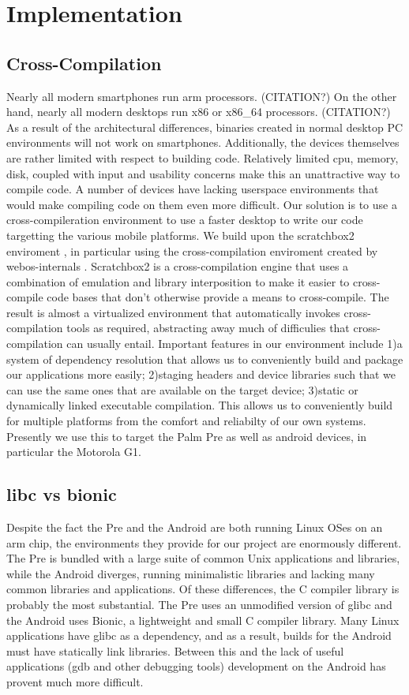 \section{Implementation}
\subsection{Cross-Compilation}
Nearly all modern smartphones run arm processors. (CITATION?)
On the other hand, nearly all modern desktops run x86 or x86\_64 processors. (CITATION?)
As a result of the architectural differences, binaries created in normal desktop PC environments will not work on smartphones.
Additionally, the devices themselves are rather limited with respect to building code.  Relatively limited cpu, memory, disk, coupled with input and usability concerns make this an unattractive way to compile code.  A number of devices have lacking userspace environments that would make compiling code on them even more difficult.
Our solution is to use a cross-compileration environment to use a faster desktop to write our code targetting the various mobile platforms.
We build upon the scratchbox2 enviroment \cite{sb2}, in particular using the cross-compilation enviroment created by webos-internals \cite{webosinterals}.
Scratchbox2 is a cross-compilation engine that uses a combination of emulation and library interposition to make it easier to cross-compile code bases that don't otherwise provide a means to cross-compile.
The result is almost a virtualized environment that automatically invokes cross-compilation tools as required, abstracting away much of difficulies that cross-compilation can usually entail.
Important features in our environment include 1)a system of dependency resolution that allows us to conveniently build and package our applications more easily; 2)staging headers and device libraries such that we can use the same ones that are available on the target device; 3)static or dynamically linked executable compilation.
This allows us to conveniently build for multiple platforms from the comfort and reliabilty of our own systems.  Presently we use this to target the Palm Pre as well as android devices, in particular the Motorola G1.

\subsection{libc vs bionic}
Despite the fact the Pre and the Android are both running Linux OSes on an arm chip, the environments they provide for our project are enormously different.  The Pre is bundled with a large suite of common Unix applications and libraries, while the Android diverges, running minimalistic libraries and lacking many common libraries and applications.  Of these differences, the C compiler library is probably the most substantial. The Pre uses an unmodified version of glibc and the Android uses Bionic, a lightweight and small C compiler library.  Many Linux applications have glibc as a dependency, and as a result, builds for the Android must have statically link libraries.  Between this and the lack of useful applications (gdb and other debugging tools) development on the Android has provent much more difficult.  
